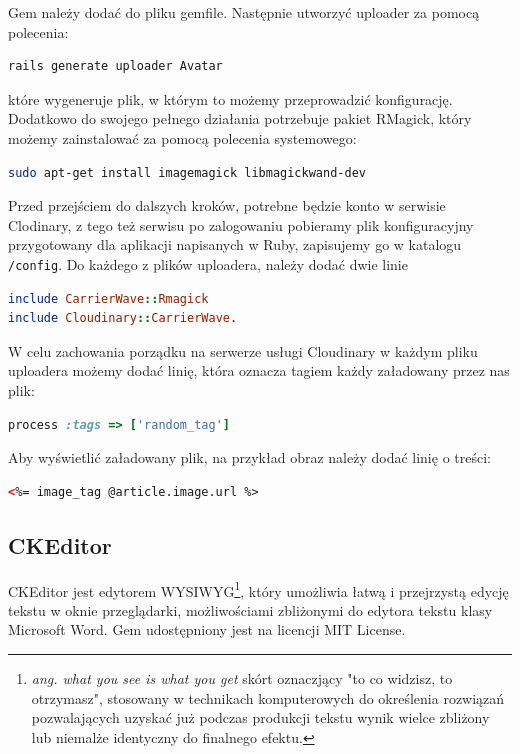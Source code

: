 \documentclass[openright]{xmgr}
\begin{document}
Gem należy dodać do pliku gemfile. Następnie utworzyć uploader za pomocą polecenia: 
\begin{lstlisting}[language=bash]
rails generate uploader Avatar
\end{lstlisting}
które wygeneruje plik, w którym to możemy przeprowadzić konfigurację. Dodatkowo do swojego pełnego działania potrzebuje pakiet RMagick, który możemy zainstalować za pomocą polecenia systemowego:
\begin{lstlisting}[language=bash, caption={Polecenie instalujące oprogramowanie RMagick}]
sudo apt-get install imagemagick libmagickwand-dev
\end{lstlisting}
Przed przejściem do dalszych kroków, potrebne będzie konto w serwisie Clodinary, z tego też serwisu po zalogowaniu pobieramy plik konfiguracyjny przygotowany dla aplikacji napisanych w Ruby, zapisujemy go w katalogu \texttt{/config}. Do każdego z plików uploadera, należy dodać dwie linie 
\begin{lstlisting}[language=ruby, caption={Framgent zawartości pliku uploadera}]
include CarrierWave::Rmagick
include Cloudinary::CarrierWave.
\end{lstlisting}

\newpage

W celu zachowania porządku na serwerze usługi Cloudinary w każdym pliku uploadera możemy dodać linię, która oznacza tagiem każdy załadowany przez nas plik: 
\begin{lstlisting}[language=ruby, caption={Przykładowy tag dla pliku}]
process :tags => ['random_tag']
\end{lstlisting}
Aby wyświetlić załadowany plik, na przykład obraz należy dodać linię o treści: 
\begin{lstlisting}[language=html, caption={Kod wyświetlający obraz}]
<%= image_tag @article.image.url %>
\end{lstlisting}

\subsection{CKEditor}
CKEditor \cite{ckeditor} jest edytorem WYSIWYG\footnote{\textit{ang. what you see is what you get} skórt oznaczjący "to co widzisz, to otrzymasz", stosowany w technikach komputerowych do określenia rozwiązań pozwalających uzyskać już podczas produkcji tekstu wynik wielce zbliżony lub niemalże identyczny do finalnego efektu.}, który umożliwia łatwą i przejrzystą edycję tekstu w oknie przeglądarki, możliwościami zbliżonymi do edytora tekstu klasy Microsoft Word. Gem udostępniony jest na licencji MIT License. 
\end{document}

